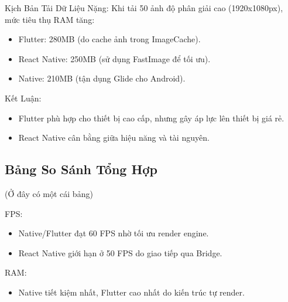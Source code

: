     \begin{flushleft}
      \hspace*{0.8cm}Kịch Bản Tải Dữ Liệu Nặng: Khi tải 50 ảnh độ phân giải cao (1920x1080px), mức tiêu thụ RAM tăng:
      \setlength{\leftmargini}{1.5cm}
      \begin{itemize}
          \item Flutter: 280MB (do cache ảnh trong ImageCache).
          \item React Native: 250MB (sử dụng FastImage để tối ưu).
          \item Native: 210MB (tận dụng Glide cho Android).
      \end{itemize}
    \end{flushleft}

    \begin{flushleft}
      \hspace*{0.8cm}Kết Luận:
      \setlength{\leftmargini}{1.5cm}
      \begin{itemize}
          \item Flutter phù hợp cho thiết bị cao cấp, nhưng gây áp lực lên thiết bị giá rẻ.
          \item React Native cân bằng giữa hiệu năng và tài nguyên.
      \end{itemize}
    \end{flushleft}

\subsection{Bảng So Sánh Tổng Hợp}
\renewcommand{\labelitemi}{--}    
    \begin{flushleft}
        \hspace*{0.8cm} (Ở đây có một cái bảng)
    \end{flushleft}

    \begin{flushleft}
      \hspace*{0.8cm}FPS:
      \setlength{\leftmargini}{1.5cm}
      \begin{itemize}
          \item Native/Flutter đạt 60 FPS nhờ tối ưu render engine.
          \item React Native giới hạn ở 50 FPS do giao tiếp qua Bridge.
      \end{itemize}
    \end{flushleft}

    \begin{flushleft}
      \hspace*{0.8cm}RAM:
      \setlength{\leftmargini}{1.5cm}
      \begin{itemize}
          \item Native tiết kiệm nhất, Flutter cao nhất do kiến trúc tự render.
      \end{itemize}
    \end{flushleft}

